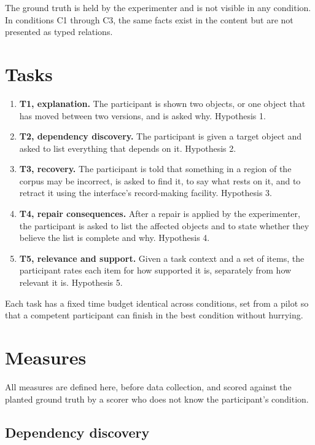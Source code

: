 \documentclass[11pt]{article}
\theoremstyle{definition}
\begin{document}
The ground truth is held by the experimenter and is not visible in any condition. In conditions C1 through C3, the same facts exist in the content but are not presented as typed relations.

\section{Tasks}

\begin{enumerate}[leftmargin=1.5em]
\item \textbf{T1, explanation.} The participant is shown two objects, or one object that has moved between two versions, and is asked why. Hypothesis 1.
\item \textbf{T2, dependency discovery.} The participant is given a target object and asked to list everything that depends on it. Hypothesis 2.
\item \textbf{T3, recovery.} The participant is told that something in a region of the corpus may be incorrect, is asked to find it, to say what rests on it, and to retract it using the interface's record-making facility. Hypothesis 3.
\item \textbf{T4, repair consequences.} After a repair is applied by the experimenter, the participant is asked to list the affected objects and to state whether they believe the list is complete and why. Hypothesis 4.
\item \textbf{T5, relevance and support.} Given a task context and a set of items, the participant rates each item for how supported it is, separately from how relevant it is. Hypothesis 5.
\end{enumerate}

Each task has a fixed time budget identical across conditions, set from a pilot so that a competent participant can finish in the best condition without hurrying.

\section{Measures}

All measures are defined here, before data collection, and scored against the planted ground truth by a scorer who does not know the participant's condition.

\subsection{Dependency discovery}
\end{document}
